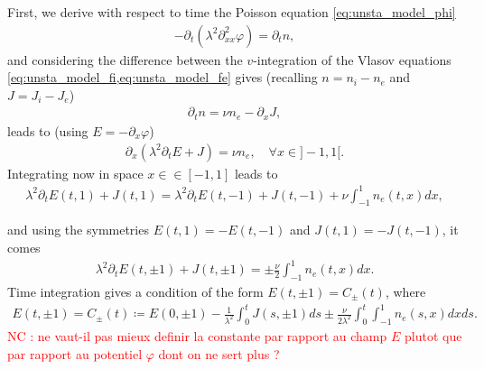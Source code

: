\documentclass{article}
\numberwithin{equation}{section}
\newcommand{\R}{\mathbb{R}}
\begin{document}
First, we derive with respect to time the Poisson equation \cref{eq:unsta_model_phi}
\begin{align*}
	- \partial_t (\lambda^2\partial_{xx}^2 \varphi) = \partial_t n, 	
\end{align*}
and considering the difference between the $v$-integration of the Vlasov equations \cref{eq:unsta_model_fi,eq:unsta_model_fe} gives (recalling $n=n_i-n_e$ and $J=J_i-J_e$) 
\begin{align*}
	\partial_t n = \nu n_e - \partial_x J,
\end{align*}
leads to (using $E=-\partial_x \varphi$) 
\begin{align*}
	\partial_x (\lambda^2\partial_t E + J) = \nu n_e, \quad \forall x\in ]-1, 1[. 	
\end{align*}
Integrating now in space $x\in\in [-1, 1]$ leads to 
\begin{align}\label{eq:ampere_integ}
	\lambda^2\partial_t E(t, 1) + J(t, 1) = \lambda^2\partial_t E(t, -1) + J(t, -1) +\nu \int_{-1}^1 n_e (t, x) dx,  
\end{align}

and using the symmetries $E(t,1)=-E(t, -1)$ and  $J(t,1)=-J(t, -1)$, it comes 
\begin{align}\label{eq:ampere_bc}
	\lambda^2\partial_t E(t, \pm 1) + J(t, \pm 1)  = \pm \frac{\nu}{2} \int_{-1}^1 n_e (t, x)dx.
\end{align}
Time integration gives a condition of the form $E(t,\pm 1) = C_{\pm}(t)$, where %
\begin{align}\label{eq:ampere_bc_phi}
	E(t,\pm 1) = C_{\pm} (t) \coloneqq E(0,\pm1) - \frac{1}{\lambda^2} \int_0^t J (s, \pm1) ds \pm \frac{\nu}{2 \lambda^2}\int_0^t  \int_{-1}^1 n_e (s, x) dx ds. 
\end{align}
\textcolor{red}{NC : ne vaut-il pas mieux definir la constante par rapport au champ $E$ plutot que par rapport au potentiel $\varphi$ dont on ne sert plus ?}
\end{document}

